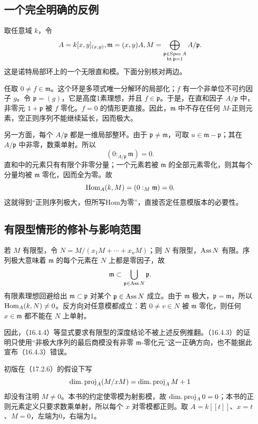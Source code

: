 \subsection*{一个完全明确的反例}
取任意域 $k$，令
\[
 A=k[x,y]_{(x,y)},\qquad\mathfrak m=(x,y)A,
 \qquad
 M=\bigoplus_{\substack{\mathfrak p\in\Spec A\\\htp\mathfrak p=1}}A/\mathfrak p.
\]
这是诺特局部环上的一个无限直和模。下面分别核对两边。

任取 $0\ne f\in\mathfrak m$。这个环是多项式唯一分解环的局部化；$f$ 有一个非单位不可约因子 $g$。令 $\mathfrak p=(g)$，它是高度1素理想，并且 $f\in\mathfrak p$。于是，在直和因子 $A/\mathfrak p$ 中，非零元 $1+\mathfrak p$ 被 $f$ 零化。$f=0$ 的情形更直接。因此，$\mathfrak m$ 中不存在任何 $M$-正则元素，空正则序列不能继续延长，因而极大。

另一方面，每个 $A/\mathfrak p$ 都是一维局部整环。由于 $\mathfrak p\ne\mathfrak m$，可取 $u\in\mathfrak m-\mathfrak p$；其在 $A/\mathfrak p$ 中非零，数乘单射。所以
\[
 (0:_{A/\mathfrak p}\mathfrak m)=0.
\]
直和中的元素只有有限个非零分量；一个元素若被 $\mathfrak m$ 的全部元素零化，则其每个分量均被 $\mathfrak m$ 零化，因而全为零。故
\[
 \operatorname{Hom}_A(k,M)=(0:_M\mathfrak m)=0.
\]
这就得到“正则序列极大，但所写Hom为零”，直接否定任意模版本的必要性。

\subsection*{有限型情形的修补与影响范围}
若 $M$ 有限型，令 $N=M/(x_1M+\cdots+x_nM)$；则 $N$ 有限型，$\operatorname{Ass} N$ 有限。序列极大意味着 $\mathfrak m$ 的每个元素在 $N$ 上都是零因子，故
\[
 \mathfrak m\subset\bigcup_{\mathfrak p\in\operatorname{Ass} N}\mathfrak p.
\]
有限素理想回避给出 $\mathfrak m\subset\mathfrak p$ 对某个 $\mathfrak p\in\operatorname{Ass} N$ 成立。由于 $\mathfrak m$ 极大，$\mathfrak p=\mathfrak m$，所以 $\operatorname{Hom}_A(k,N)\ne0$。反方向对任意模都成立：若 $0\ne v\in N$ 被 $\mathfrak m$ 零化，则任何 $x\in\mathfrak m$ 都不能在 $N$ 上单射。

因此，（16.4.4）等显式要求有限型的深度结论不被上述反例推翻。（16.4.3）的证明只使用“非极大序列的最后商模没有非零 $\mathfrak m$-零化元”这一正确方向，也不能据此宣布（16.4.3）错误。

初版在（17.2.6）的假设下写
\[
 \operatorname{dim.proj}_A(M/xM)=\operatorname{dim.proj}_A M+1
\]
却没有注明 $M\ne0$。本书的约定使零模为射影模，故 $\operatorname{dim.proj}_A0=0$；本书的正则元素定义只要求数乘单射，所以每个 $x$ 对零模都正则。取 $A=k[[t]]$、$x=t$、$M=0$，左端为0，右端为1。

